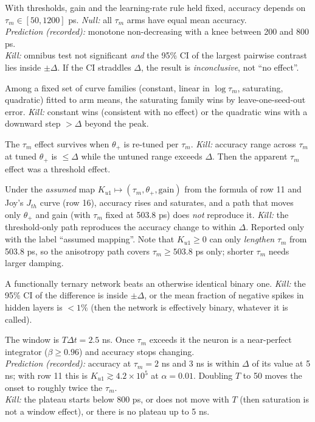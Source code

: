 \documentclass[10pt,a4paper]{article}
\newcommand{\taum}{\tau_m}
\newcommand{\ptn}{\Delta}
\begin{document}
\begin{description}[leftmargin=0pt,labelsep=6pt]
\item[H1 (algorithmic effect).] With thresholds, gain and the learning-rate rule held fixed, accuracy depends on $\taum\in[50,1200]$ ps. \emph{Null:} all $\taum$ arms have equal mean accuracy.\\
\textit{Prediction (recorded):} monotone non-decreasing with a knee between 200 and 800 ps.\\
\textit{Kill:} omnibus test not significant \emph{and} the 95\% CI of the largest pairwise contrast lies inside $\pm\ptn$. If the CI straddles $\ptn$, the result is \emph{inconclusive}, not ``no effect''.
\item[H2 (shape).] Among a fixed set of curve families (constant, linear in $\log\taum$, saturating, quadratic) fitted to arm means, the saturating family wins by leave-one-seed-out error. \emph{Kill:} constant wins (consistent with no effect) or the quadratic wins with a downward step $>\ptn$ beyond the peak.
\item[H3 (confound separation).] The $\taum$ effect survives when $\theta_+$ is re-tuned per $\taum$. \emph{Kill:} accuracy range across $\taum$ at tuned $\theta_+$ is $\le\ptn$ while the untuned range exceeds $\ptn$. Then the apparent $\taum$ effect was a threshold effect.
\item[H4 (anisotropy path; exploratory).] Under the \emph{assumed} map $K_{u1}\mapsto(\taum,\theta_+,\text{gain})$ from the formula of row 11 and Joy's $J_{th}$ curve (row 16), accuracy rises and saturates, and a path that moves only $\theta_+$ and gain (with $\taum$ fixed at 503.8 ps) does \emph{not} reproduce it. \emph{Kill:} the threshold-only path reproduces the accuracy change to within $\ptn$. Reported only with the label ``assumed mapping''. Note that $K_{u1}\ge0$ can only \emph{lengthen} $\taum$ from 503.8 ps, so the anisotropy path covers $\taum\ge503.8$ ps only; shorter $\taum$ needs larger damping.
\item[H5 (ternary matters).] A functionally ternary network beats an otherwise identical binary one. \emph{Kill:} the 95\% CI of the difference is inside $\pm\ptn$, or the mean fraction of negative spikes in hidden layers is $<1\%$ (then the network is effectively binary, whatever it is called).
\item[H6 (window plateau; exploratory).] The window is $T\Delta t=2.5$ ns. Once $\taum$ exceeds it the neuron is a near-perfect integrator ($\beta\ge0.96$) and accuracy stops changing.\\
\textit{Prediction (recorded):} accuracy at $\taum=2$ ns and 3 ns is within $\ptn$ of its value at 5 ns; with row 11 this is $K_{u1}\gtrsim4.2\times10^5$ at $\alpha=0.01$. Doubling $T$ to 50 moves the onset to roughly twice the $\taum$.\\
\textit{Kill:} the plateau starts below 800 ps, or does not move with $T$ (then saturation is not a window effect), or there is no plateau up to 5 ns.
\end{description}
\end{document}
